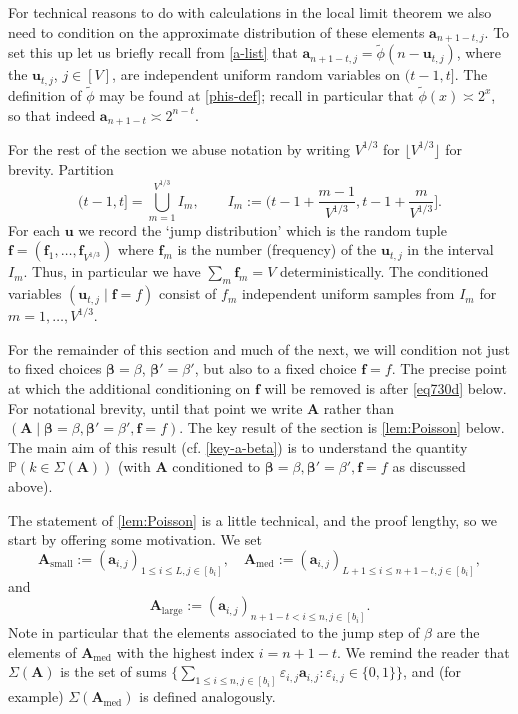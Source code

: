 \documentclass[11pt,reqno]{amsart}
\numberwithin{equation}{section}
\theoremstyle{definition}
\theoremstyle{remark}
\newcommand{\mb}{\mathbb}
\newcommand{\mbf}{\mathbf}
\newcommand{\eps}{\varepsilon}
\def\boldbeta{\boldsymbol\beta}
\renewcommand{\le}{\leqslant}
\def\sml{\operatorname{small}}
\def\lrg{\operatorname{large}}
\def\med{\operatorname{med}}
\begin{document}
For technical reasons to do with calculations in the local limit theorem we also need to condition on the approximate distribution of these elements $\mbf{a}_{n + 1 - t,j}$. To set this up let us briefly recall from \cref{a-list} that $\mbf{a}_{n + 1 -t,j} = \tilde\phi(n - \mbf{u}_{t,j})$, where the $\mbf{u}_{t,j}$, $j \in [V]$, are independent uniform random variables on $(t-1,t]$. The definition of $\tilde\phi$ may be found at \cref{phis-def}; recall in particular that $\tilde\phi(x) \asymp 2^x$, so that indeed $\mbf{a}_{n + 1 - t} \asymp 2^{n - t}$.


For the rest of the section we abuse notation by writing $V^{1/3}$ for $\lfloor V^{1/3}\rfloor$ for brevity. Partition 
\begin{equation}\label{im-def} (t - 1,t] = \bigcup_{m = 1}^{V^{1/3}} I_m, \qquad I_m := \big( t - 1+ \frac{m - 1}{V^{1/3}}, t - 1 + \frac{m}{V^{1/3}}\big].\end{equation}
For each $\mbf{u}$ we record the `jump distribution' which is the random tuple $\mbf{f}  = (\mbf{f}_1,\dots, \mbf{f}_{V^{1/3}})$ where $\mbf{f}_m$ is the number (frequency) of the $\mbf{u}_{t,j}$ in the interval $I_m$. Thus, in particular we have $\sum_m \mbf{f}_m = V$ deterministically. The conditioned variables $(\mbf{u}_{t,j} \mid \mbf{f} = f)$ consist of $f_m$ independent uniform samples from $I_m$ for $m = 1,\dots, V^{1/3}$. 

For the remainder of this section and much of the next, we will condition not just to fixed choices $\boldbeta = \beta$, $\boldbeta' = \beta'$, but also to a fixed choice $\mbf{f} = f$. The precise point at which the additional conditioning on $\mbf{f}$ will be removed is after \cref{eq730d} below. For notational brevity, until that point we write $\mbf{A}$ rather than $(\mbf{A} \mid \boldbeta = \beta, \boldbeta' = \beta', \mbf{f} = f)$. The key result of the section is \cref{lem:Poisson} below. The main aim of this result (cf. \cref{key-a-beta}) is to understand the quantity $\mb{P}(k \in \Sigma(\mbf{A}))$ (with $\mbf{A}$ conditioned to $\boldbeta = \beta,\boldbeta' = \beta', \mbf{f} = f$ as discussed above).

The statement of \cref{lem:Poisson} is a little technical, and the proof lengthy, so we start by offering some motivation. We set 
\begin{equation}\label{as-def} \mbf{A}_{\sml} := (\mbf{a}_{i,j})_{1 \le i \le L, j \in [b_i]}, \quad  \mbf{A}_{\med} := (\mbf{a}_{i,j})_{L+1 \le i \le n + 1 - t, j \in [b_i]},\end{equation}
and
\begin{equation*}  \mbf{A}_{\lrg} := (\mbf{a}_{i,j})_{n +1 - t < i \le n, j \in [b_i]}.\end{equation*}
Note in particular that the elements associated to the jump step of $\beta$ are the elements of $\mbf{A}_{\med}$ with the highest index $i = n + 1 - t$.
We remind the reader that $\Sigma (\mbf{A})$ is the set of sums $\{\sum_{1 \le i \le n, j \in [b_i]} \eps_{i,j} \mbf{a}_{i,j} : \eps_{i,j} \in \{0,1\}\}$, and (for example) $\Sigma(\mbf{A}_{\med})$ is defined analogously.
\end{document}
